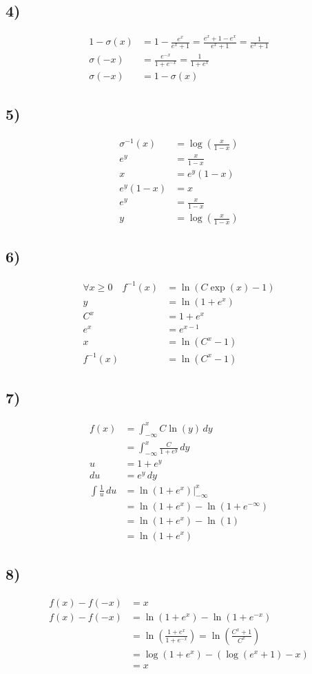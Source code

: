 \documentclass{article}
\begin{document}
\subsection*{4)}
\begin{align*}
1 - \sigma(x) &= 1 - \frac{e^x}{e^x+1} = \frac{e^x+1 - e^x}{e^x+1} = \frac{1}{e^x+1} \\
\sigma(-x) &= \frac{e^{-x}}{1+e^{-x}} = \frac{1}{1+e^x} \\
\sigma(-x) &= 1 - \sigma(x)
\end{align*}

\subsection*{5)}
\begin{align*}
\sigma^{-1}(x) &= \log\left(\frac{x}{1-x}\right) \\
e^y &= \frac{x}{1-x} \\
x &= e^y(1-x) \\
e^y(1-x) &= x \\
e^y &= \frac{x}{1-x} \\
y &= \log\left(\frac{x}{1-x}\right)
\end{align*}

\subsection*{6)}
\begin{align*}
\forall x \geq 0 \quad f^{-1}(x) &= \ln\left(C \exp(x) - 1\right) \\
y &= \ln(1 + e^x) \\
C^x &= 1 + e^x \\
e^x &= e^{x - 1} \\
x &= \ln(C^x - 1) \\
f^{-1}(x) &= \ln(C^x - 1)
\end{align*}

\subsection*{7)}
\begin{align*}
f(x) &= \int_{-\infty}^{x} C \ln(y) \, dy \\
&= \int_{-\infty}^{x} \frac{C}{1 + e^y} \, dy \\
u &= 1 + e^y \\
du &= e^y \, dy \\
\int \frac{1}{u} \, du &= \ln(1 + e^x) \bigg|_{-\infty}^{x} \\
&= \ln(1 + e^x) - \ln(1 + e^{-\infty}) \\
&= \ln(1 + e^x) - \ln(1) \\
&= \ln(1 + e^x)
\end{align*}

\subsection*{8)}
\begin{align*}
f(x) - f(-x) &= x \\
f(x) - f(-x) &= \ln(1 + e^x) - \ln(1 + e^{-x}) \\
&= \ln\left(\frac{1 + e^x}{1 + e^{-x}}\right) = \ln\left(\frac{C^x + 1}{C^x}\right) \\
&= \log(1 + e^x) - \left( \log(e^x + 1) - x \right) \\
&= x
\end{align*}
\end{document}
